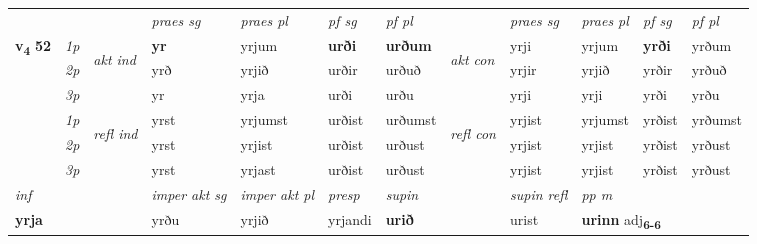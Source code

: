 \begin{longtable}[l]{X>{\footnotesize\itshape}llXXXXlXXXX}
 & &   & \textit{praes sg}  & \textit{praes pl}    & \textit{ pf sg} & \textit{pf pl} & & \textit{praes sg}  & \textit{praes pl}    & \textit{pf sg} & \textit{pf pl }  \\ \cmidrule{4-7} \cmidrule{9-12}
 \multirow{2}{*}{{{\textbf{v{\textsubscript{4}}} \Large{\textbf{52}}}}}  & 1p & \multirow{3}{*}{\begin{turn}{90}\textit{akt ind}\end{turn}} & \textbf{yr} & yrjum & \textbf{urði} & \textbf{urðum} & \multirow{3}{*}{\begin{turn}{90}\textit{akt con}\end{turn}} &yrji & yrjum & \textbf{yrði} & yrðum\\*
 & 2p &  &  yrð  & yrjið & urðir & urðuð & & yrjir & yrjið & yrðir & yrðuð \\*
 & 3p &  & yr & yrja & urði & urðu & & yrji & yrji& yrði & yrðu \\*
\cmidrule{4-7} \cmidrule{9-12}
 & 1p & \multirow{3}{*}{\begin{turn}{90}\textit{refl ind}\end{turn}}  & yrst & yrjumst & urðist & urðumst & \multirow{3}{*}{\begin{turn}{90}\textit{refl con}\end{turn}}  &yrjist & yrjumst & yrðist & yrðumst \\*
 & 2p &  & yrst & yrjist & urðist & urðust & &yrjist & yrjist & yrðist & yrðust \\*
 & 3p  & & yrst & yrjast & urðist & urðust & & yrjist & yrjist& yrðist & yrðust \\*
\cmidrule{4-7} \cmidrule{9-12}

   {\textit{inf}} & &  & \textit{imper akt sg} & \textit{imper akt pl}   & \textit{presp} & \textit{supin} && \textit{supin refl} & \textit{pp m} \\*
  {\textbf{yrja}} & && yrðu  & yrjið   & yrjandi &  \textbf{urið} && urist & \multicolumn{2}{l}{\textbf{urinn} adj\textbf{\textsubscript{6-6}}} \\*


\end{longtable}
